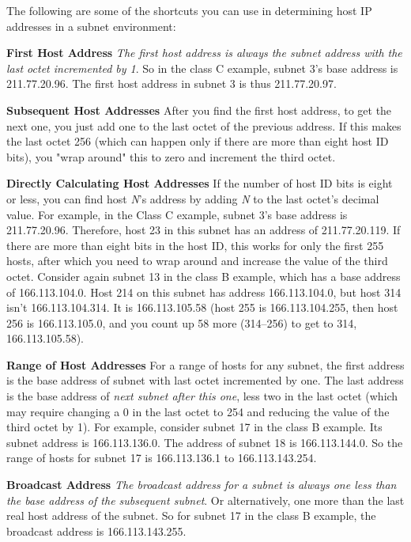 \documentclass[b5paper,11pt]{memoir}
\begin{document}
The following are some of the shortcuts you can use in determining host
IP addresses in a subnet environment:

{\textbf{First Host Address}} {\emph{The first host address is always
the subnet address with the last octet incremented by 1}}. So in the
class C example, subnet 3's base address is 211.77.20.96. The first host
address in subnet 3 is thus 211.77.20.97.

{\textbf{Subsequent Host Addresses}} After you find the first host
address, to get the next one, you just add one to the last octet of the
previous address. If this makes the last octet 256 (which can happen
only if there are more than eight host ID bits), you "wrap around" this
to zero and increment the third octet.

{\textbf{Directly Calculating Host Addresses}} If the number of host ID
bits is eight or less, you can find host {\emph{N}}'s address by adding
{\emph{N}} to the last octet's decimal value. For example, in the Class
C example, subnet 3's base address is 211.77.20.96. Therefore, host 23
in this subnet has an address of 211.77.20.119. If there are more than
eight bits in the host ID, this works for only the first 255 hosts,
after which you need to wrap around and increase the value of the third
octet. Consider again subnet 13 in the class B example, which has a base
address of 166.113.104.0. Host 214 on this subnet has address
166.113.104.0, but host 314 isn't 166.113.104.314. It is 166.113.105.58
(host 255 is 166.113.104.255, then host 256 is 166.113.105.0, and you
count up 58 more (314--256) to get to 314, 166.113.105.58).

{\textbf{Range of Host Addresses}} For a range of hosts for any subnet,
the first address is the base address of subnet with last octet
incremented by one. The last address is the base address of {\emph{next
subnet after this one}}, less two in the last octet (which may require
changing a 0 in the last octet to 254 and reducing the value of the
third octet by 1). For example, consider subnet 17 in the class B
example. Its subnet address is 166.113.136.0. The address of subnet 18
is 166.113.144.0. So the range of hosts for subnet 17 is 166.113.136.1
to 166.113.143.254.

{\textbf{Broadcast Address}} {\emph{The broadcast address for a subnet
is always one less than the base address of the subsequent subnet}}. Or
alternatively, one more than the last real host address of the subnet.
So for subnet 17 in the class B example, the broadcast address is
166.113.143.255.
\end{document}
